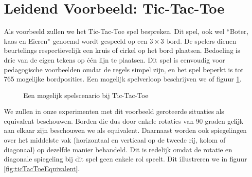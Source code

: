 \section{Leidend Voorbeeld: Tic-Tac-Toe}
\begin{leftbar}
Als voorbeeld zullen we het Tic-Tac-Toe spel bespreken. Dit spel, ook wel ``Boter, kaas en Eieren'' genoemd wordt gespeeld op een $3\times3$ bord. De spelers dienen beurtelings respectievelijk een kruis of cirkel op het bord plaatsen. Bedoeling is drie van de eigen tekens op \'e\'en lijn te plaatsen. Dit spel is eenvoudig voor pedagogische voorbeelden omdat de regels simpel zijn, en het spel beperkt is tot 765 mogelijke bordposities. Een mogelijk spelverloop beschrijven we of figuur \ref{fig:ticTacToeExample}.
\end{leftbar}
\begin{figure}[htb]
\centering
{}
\caption{Een mogelijk spelscenario bij Tic-Tac-Toe}
\label{fig:ticTacToeExample}
\end{figure}
\begin{leftbar}
We zullen in onze experimenten met dit voorbeeld geroteerde situaties als equivalent beschouwen. Borden die dus door enkele rotaties van 90 graden gelijk aan elkaar zijn beschouwen we als equivalent. Daarnaast worden ook spiegelingen over het middelste vak (horizontaal en verticaal op de tweede rij, kolom of diagonaal) op dezelfde manier behandeld. Dit is redelijk omdat de rotatie en diagonale spiegeling bij dit spel geen enkele rol speelt. Dit illustreren we in figuur \ref{fig:ticTacToeEquivalent}.
\end{leftbar}
